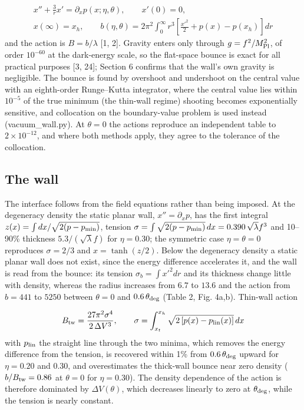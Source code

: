 \documentclass[preprint,12pt]{elsarticle}
\begin{document}
\begin{equation}\begin{gathered}
x''+\frac{3}{r}x'=\partial_xp(x;\eta,\theta),\qquad x'(0)=0,\\
x(\infty)=x_h,\qquad b(\eta,\theta)=2\pi^2\int_0^\infty r^3\left[\frac{x'^2}{2}+p(x)-p(x_h)\right]dr
\end{gathered}\end{equation}
and the action is $B=b/\lambda$ [1, 2]. Gravity enters only through $g=f^2/M_{\rm Pl}^2$, of order $10^{-60}$ at the dark-energy scale, so the flat-space bounce is exact for all practical purposes [3, 24]; Section 6 confirms that the wall's own gravity is negligible. The bounce is found by overshoot and undershoot on the central value with an eighth-order Runge--Kutta integrator, where the central value lies within $10^{-5}$ of the true minimum (the thin-wall regime) shooting becomes exponentially sensitive, and collocation on the boundary-value problem is used instead (vacuum\_wall.py). At $\theta=0$ the actions reproduce an independent table to $2\times10^{-12}$, and where both methods apply, they agree to the tolerance of the collocation.

\subsection{The wall}
The interface follows from the field equations rather than being imposed. At the degeneracy density the static planar wall, $x''=\partial_xp$, has the first integral $z(x)=\int dx/\sqrt{2(p-p_{\rm min})}$, tension $\sigma=\int\sqrt{2(p-p_{\rm min})}\,dx=0.390\,\sqrt\lambda f^3$ and 10--90\% thickness $5.3/(\sqrt\lambda f)$ for $\eta=0.30$; the symmetric case $\eta=\theta=0$ reproduces $\sigma=2/3$ and $x=\tanh(z/2)$. Below the degeneracy density a static planar wall does not exist, since the energy difference accelerates it, and the wall is read from the bounce: its tension $\sigma_b=\int x'^2dr$ and its thickness change little with density, whereas the radius increases from $6.7$ to $13.6$ and the action from $b=441$ to $5250$ between $\theta=0$ and $0.6\,\theta_{\rm deg}$ (Table 2, Fig. 4a,b). Thin-wall action

\begin{equation}
B_{\rm tw}=\frac{27\pi^2\sigma^4}{2\,\Delta V^3},\qquad \sigma=\int_{x_t}^{x_h}\sqrt{2\,[p(x)-p_{\rm lin}(x)]}\,dx
\end{equation}
with $p_{\rm lin}$ the straight line through the two minima, which removes the energy difference from the tension, is recovered within 1\% from $0.6\,\theta_{\rm deg}$ upward for $\eta=0.20$ and 0.30, and overestimates the thick-wall bounce near zero density ($b/B_{\rm tw}=0.86$ at $\theta=0$ for $\eta=0.30$). The density dependence of the action is therefore dominated by $\Delta V(\theta)$, which decreases linearly to zero at $\theta_{\rm deg}$, while the tension is nearly constant.
\end{document}
